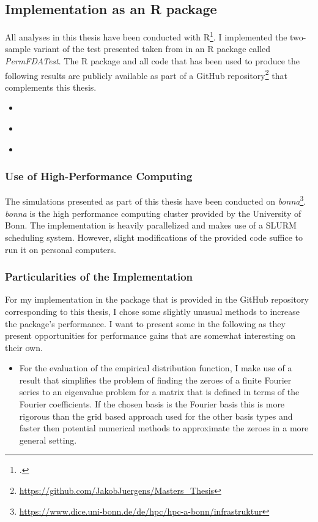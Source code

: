 \documentclass[12pt, a4paper]{article}
\theoremstyle{MAstyle} \newtheorem{assumption}{Assumption}[section]
\theoremstyle{MAstyle} \newtheorem{definition}{Definition}[section]
\theoremstyle{MAstyle} \newtheorem{theorem}{Theorem}[section]
\begin{document}
		\subsection{Implementation as an R package}
			All analyses in this thesis have been conducted with R\footcite{R}. I implemented the two-sample variant of the test presented taken from \cite{bugni_permutation_2021} in an R package called \textit{PermFDATest}. The R package and all code that has been used to produce the following results are publicly available as part of a GitHub repository\footnote{\href{https://github.com/JakobJuergens/Masters_Thesis}{https://github.com/JakobJuergens/Masters\_Thesis}} that complements this thesis.
			
			\begin{itemize}
				\item \cite{fda}
				\item \cite{tidyverse}
				\item \cite{refund}
			\end{itemize}
			
		\subsubsection{Use of High-Performance Computing}
			The simulations presented as part of this thesis have been conducted on \textit{bonna}\footnote{\href{https://www.dice.uni-bonn.de/de/hpc/hpc-a-bonn/infrastruktur}{https://www.dice.uni-bonn.de/de/hpc/hpc-a-bonn/infrastruktur}}. \textit{bonna} is the high performance computing cluster provided by the University of Bonn. The implementation is heavily parallelized and makes use of a SLURM scheduling system. However, slight modifications of the provided code suffice to run it on personal computers.

		\subsubsection{Particularities of the Implementation}
			For my implementation in the package that is provided in the GitHub repository corresponding to this thesis, I chose some slightly unusual methods to increase the package's performance. I want to present some in the following as they present opportunities for performance gains that are somewhat interesting on their own.
			\begin{itemize}
				\item For the evaluation of the empirical distribution function, I make use of a result \cite{boyd_computing_2006} that simplifies the problem of finding the zeroes of a finite Fourier series to an eigenvalue problem for a matrix that is defined in terms of the Fourier coefficients. If the chosen basis is the Fourier basis this is more rigorous than the grid based approach used for the other basis types and faster then potential numerical methods to approximate the zeroes in a more general setting.
			\end{itemize}
\end{document}
